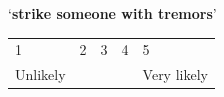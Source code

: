 \documentclass[output=paper]{langsci/langscibook}
\begin{document}
\begin{paperappendix}
{\noindent \enquote*{\textbf{strike someone with tremors}}\vspace{.5\baselineskip}

\noindent \begin{tabularx}{\textwidth}{XXXXX}
        1 & 2 & 3 & 4 & 5\\
        Unlikely & & & & Very likely\\
        \end{tabularx}
}



\end{paperappendix}
\end{document}
